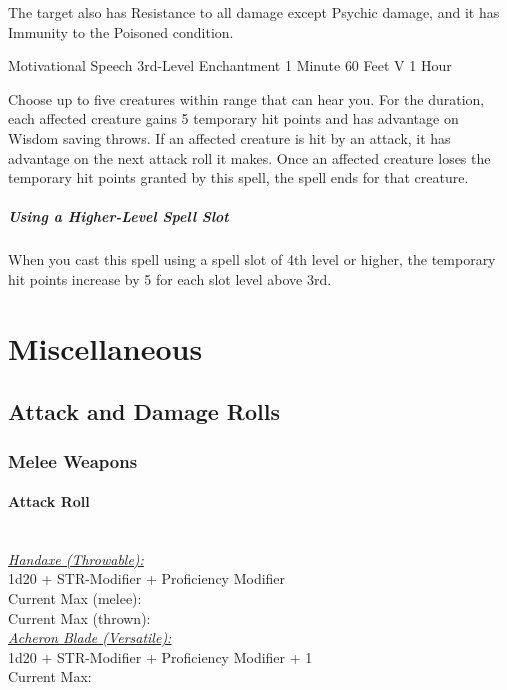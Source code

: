 \documentclass[letterpaper,openany,oneside,twocolumn]{book}
\begin{document}
The target also has Resistance to all damage except Psychic damage, and it has Immunity to the Poisoned condition.

\DndSpellHeader
  {Motivational Speech}
  {3rd-Level Enchantment}
  {1 Minute}
  {60 Feet}
  {V}
  {1 Hour}

Choose up to five creatures within range that can hear you. For the duration, each affected creature gains 5 temporary hit points and has advantage on Wisdom saving throws. If an affected creature is hit by an attack, it has advantage on the next attack roll it makes. Once an affected creature loses the temporary hit points granted by this spell, the spell ends for that creature.

\subparagraph*{Using a Higher-Level Spell Slot} When you cast this spell using a spell slot of 4th level or higher, the temporary hit points increase by 5 for each slot level above 3rd.

\section*{Miscellaneous}
\subsection*{Attack and Damage Rolls}
\subsubsection*{Melee Weapons}
\paragraph*{Attack Roll}\hfill\\
\underline{\textit{Handaxe (Throwable):}}\\
1d20 + STR-Modifier + Proficiency Modifier\\
\indent Current Max (melee): \\
\indent Current Max (thrown): 
\\
\underline{\textit{Acheron Blade (Versatile):}}\\
1d20 + STR-Modifier + Proficiency Modifier + 1\\
\indent Current Max: 
\end{document}
